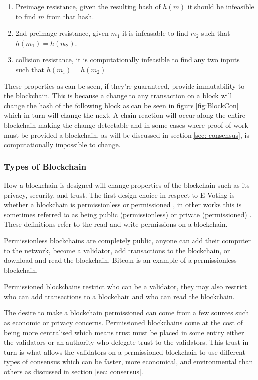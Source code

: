 \documentclass{entcs}
\begin{document}
\begin{enumerate}
    \item Preimage resistance, given the resulting hash of \(h(m)\) it should be infeasible to find \(m\) from that hash. 
    \item 2nd-preimage resistance, given \(m_1\) it is infeasable to find \(m_2\) such that \(h(m_1) = h(m_2)\).
    \item collision resistance, it is computationally infeasible to find any two inputs such that \(h(m_1) = h(m_2)\)
\end{enumerate}

These properties as can be seen, if they're guaranteed, provide immutability to the blockchain. This is because a change to any transaction on a block will change the hash of the following block as can be seen in figure \ref{fig:BlockCon} which in turn will change the next. A chain reaction will occur along the entire blockchain making the change detectable and in some cases where proof of work must be provided a blockchain, as will be discussed in section \ref{sec: consensus}, is computationally impossible to change.

\subsubsection{Types of Blockchain}
How a blockchain is designed will change properties of the blockchain such as its privacy, security, and trust. The first design choice in respect to E-Voting is whether a blockchain is permissionless or permissioned \cite{wust2018need}, in other works this is sometimes referred to as being public (permissionless) or private (permissioned) \cite{blockchainBeginners}. These definitions refer to the read and write permissions on a blockchain. 

Permissionless blockchains are completely public, anyone can add their computer to the network, become a validator, add transactions to the blockchain, or download and read the blockchain. Bitcoin is an example of a permissionless blockchain.

Permissioned blockchains restrict who can be a validator, they may also restrict who can add transactions to a blockchain and who can read the blockchain. 

The desire to make a blockchain permissioned can come from a few sources such as economic or privacy concerns. Permissioned blockchains come at the cost of being more centralised which means trust must be placed in some entity either the validators or an authority who delegate trust to the validators. This trust in turn is what allows the validators on a permissioned blockchain to use different types of consensus which can be faster, more economical, and environmental than others as discussed in section \ref{sec: consensus}.
\end{document}
